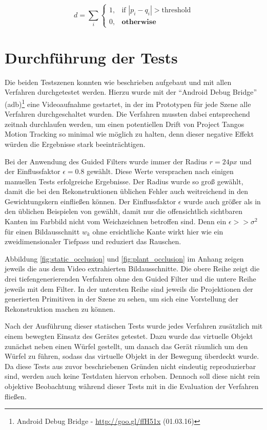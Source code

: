 \begin{equation} \label{eq:diff}
d = \sum_i 
	\begin{cases}
		1, & \text{if } | p_i - q_i | > \text{threshold} \\
		0, & \textbf{otherwise}
	\end{cases}
\end{equation}

\section{Durchführung der Tests}

Die beiden Testszenen konnten wie beschrieben aufgebaut und mit allen Verfahren durchgetestet werden. Hierzu wurde mit der \enquote{Android Debug Bridge} (adb)\footnote{Android Debug Bridge - \url{http://goo.gl/ffH51x} (01.03.16)} eine Videoaufnahme gestartet, in der im Prototypen für jede Szene alle Verfahren durchgeschaltet wurden. Die Verfahren mussten dabei entsprechend zeitnah durchlaufen werden, um einen potentiellen Drift von Project Tangos Motion Tracking so minimal wie möglich zu halten, denn dieser negative Effekt würden die Ergebnisse stark beeinträchtigen. 

Bei der Anwendung des Guided Filters wurde immer der Radius \(r = 24px\) und der Einflussfaktor \(\epsilon = 0.8\) gewählt. Diese Werte versprachen nach einigen manuellen Tests erfolgreiche Ergebnisse. Der Radius wurde so groß gewählt, damit die bei den Rekonstruktionen üblichen Fehler auch weitreichend in den Gewichtungskern einfließen können. Der Einflussfaktor \(\epsilon\) wurde auch größer als in den üblichen Beispielen von \citep{he2010guided} gewählt, damit nur die offensichtlich sichtbaren Kanten im Farbbild nicht vom Weichzeichnen betroffen sind. Denn ein \(\epsilon >> \sigma^2 \) für einen Bildausschnitt \(w_k\) ohne ersichtliche Kante wirkt hier wie ein zweidimensionaler Tiefpass und reduziert das Rauschen.

Abbildung \ref{fig:static_occlusion} und \ref{fig:plant_occlusion} im Anhang zeigen jeweils die aus dem Video extrahierten Bildausschnitte. Die obere Reihe zeigt die drei tiefengenerierenden Verfahren ohne den Guided Filter und die untere Reihe jeweils mit dem Filter. In der untersten Reihe sind jeweils die Projektionen der generierten Primitiven in der Szene zu sehen, um sich eine Vorstellung der Rekonstruktion machen zu können.

Nach der Ausführung dieser statischen Tests wurde jedes Verfahren zusätzlich mit einem bewegten Einsatz des Gerätes getestet. Dazu wurde das virtuelle Objekt zunächst neben einen Würfel gestellt, um danach das Gerät räumlich um den Würfel zu führen, sodass das virtuelle Objekt in der Bewegung überdeckt wurde. Da diese Tests aus zuvor beschriebenen Gründen nicht eindeutig reproduzierbar sind, werden auch keine Testdaten hiervon erhoben. Dennoch soll diese nicht rein objektive Beobachtung während dieser Tests mit in die Evaluation der Verfahren fließen.

